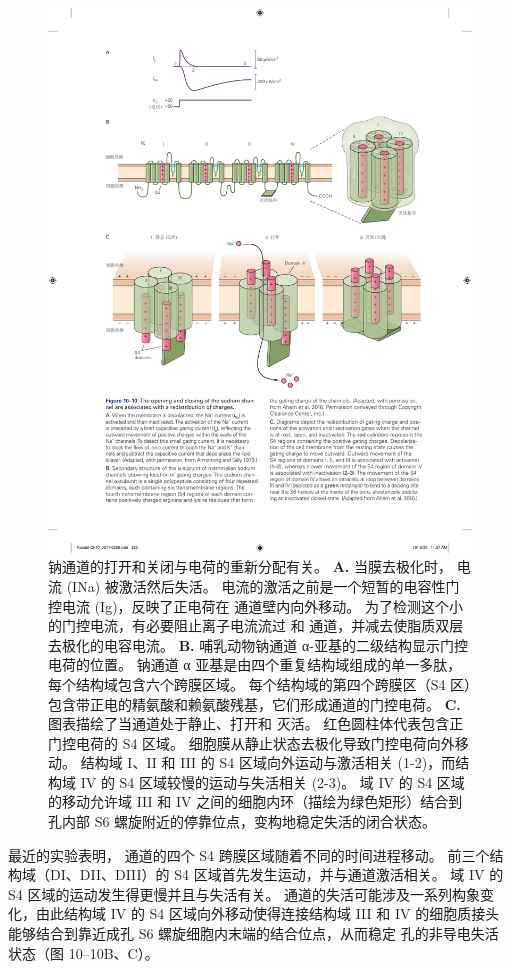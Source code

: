 \begin{figure}[htbp]
	\centering
	\includegraphics[width=0.8\linewidth]{chap10/fig_10_10}
	\caption{钠通道的打开和关闭与电荷的重新分配有关。
		\textbf{A.} 当膜去极化时， 电流 (INa) 被激活然后失活。
		 电流的激活之前是一个短暂的电容性门控电流 (Ig)，反映了正电荷在  通道壁内向外移动。
		为了检测这个小的门控电流，有必要阻止离子电流流过  和  通道，并减去使脂质双层去极化的电容电流\cite{armstrong1979fast}。
		\textbf{B.} 哺乳动物钠通道 α-亚基的二级结构显示门控电荷的位置。
		钠通道 α 亚基是由四个重复结构域组成的单一多肽，每个结构域包含六个跨膜区域。 每个结构域的第四个跨膜区（S4 区）包含带正电的精氨酸和赖氨酸残基，它们形成通道的门控电荷\cite{ahern2016hitchhiker}。
		\textbf{C.} 图表描绘了当通道处于静止、打开和 灭活。 红色圆柱体代表包含正门控电荷的 S4 区域。
		细胞膜从静止状态去极化导致门控电荷向外移动。
		结构域 I、II 和 III 的 S4 区域向外运动与激活相关 (1-2)，而结构域 IV 的 S4 区域较慢的运动与失活相关 (2-3)。
		域 IV 的 S4 区域的移动允许域 III 和 IV 之间的细胞内环（描绘为绿色矩形）结合到孔内部 S6 螺旋附近的停靠位点，变构地稳定失活的闭合状态\cite{ahern2016hitchhiker}。}
	\label{fig:10_10}
\end{figure}



最近的实验表明， 通道的四个 S4 跨膜区域随着不同的时间进程移动。 
前三个结构域（DI、DII、DIII）的 S4 区域首先发生运动，并与通道激活相关。 
域 IV 的 S4 区域的运动发生得更慢并且与失活有关。 
 通道的失活可能涉及一系列构象变化，由此结构域 IV 的 S4 区域向外移动使得连接结构域 III 和 IV 的细胞质接头能够结合到靠近成孔 S6 螺旋细胞内末端的结合位点，从而稳定 孔的非导电失活状态（图 10–10B、C）。


